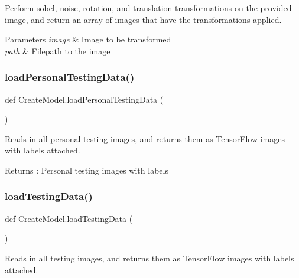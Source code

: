Perform sobel, noise, rotation, and translation transformations on the provided image, and return an array of images that have the transformations applied. 


\begin{DoxyParams}{Parameters}
{\em image} & Image to be transformed \\
\hline
{\em path} & Filepath to the image \\
\hline
\end{DoxyParams}
\mbox{\label{namespaceCreateModel_a6b6cb30f9a38350655c81bf380898084}} 
\subsubsection{\texorpdfstring{load\+Personal\+Testing\+Data()}{loadPersonalTestingData()}}
{\footnotesize\ttfamily def Create\+Model.\+load\+Personal\+Testing\+Data (\begin{DoxyParamCaption}{ }\end{DoxyParamCaption})}



Reads in all personal testing images, and returns them as Tensor\+Flow images with labels attached. 

\begin{DoxyReturn}{Returns}
\+: Personal testing images with labels 
\end{DoxyReturn}
\mbox{\label{namespaceCreateModel_a6d6154f59653471f7fc359cca6daabff}} 
\subsubsection{\texorpdfstring{load\+Testing\+Data()}{loadTestingData()}}
{\footnotesize\ttfamily def Create\+Model.\+load\+Testing\+Data (\begin{DoxyParamCaption}{ }\end{DoxyParamCaption})}



Reads in all testing images, and returns them as Tensor\+Flow images with labels attached. 

